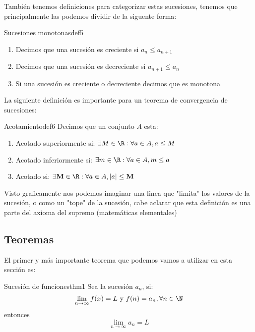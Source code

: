 También tenemos definiciones para categorizar estas sucesiones, tenemos que principalmente las podemos dividir de la siguente forma:

\begin{definicion}{Sucesiones monotonas}{def5}
    \begin{enumerate}
        \item Decimos que una sucesión es creciente si $a_n \leq a_{n + 1}$
        \item Decimos que una sucesión es decreciente si $a_{n + 1} \leq {a_n}$
        \item Si una sucesión es creciente o decreciente decimos que es monotona
    \end{enumerate}
\end{definicion}

La siguiente definición es importante para un teorema de convergencia de sucesiones:

\begin{definicion}{Acotamiento}{def6}
    Decimos que un conjunto $A$ esta:
    \begin{enumerate}
        \item Acotado superiormente si: $\exists M \in \R: \forall a \in A, a \leq M$
        \item Acotado inferiormente si: $\exists m \in \R: \forall a \in A, m \leq a$
        \item Acotado si: $\exists \mathbf{M} \in \R: \forall a \in A, |a| \leq \mathbf{M}$
    \end{enumerate}
\end{definicion}

\begin{nota}
    Visto graficamente nos podemos imaginar una linea que "limita" los valores de la sucesión, o como un "tope" de la sucesión, cabe aclarar que esta definición es una parte del axioma del supremo (matemáticas elementales)
\end{nota}

\subsection{Teoremas}

El primer y más importante teorema que podemos vamos a utilizar en esta sección es:

\begin{teorema}{Sucesión de funciones}{thm1}
    Sea la sucesión $a_n$, si:
    \[ 
        \lim_{n \to \infty} f(x) = L \text{ y } f(n) = a_n, \forall n \in \N
    \]
    entonces
    \[ 
        \lim_{n \to \infty} a_n = L
    \]
\end{teorema}

